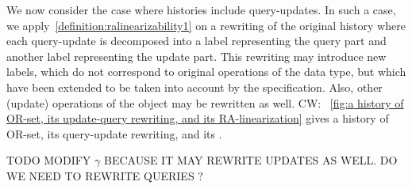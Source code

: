 We now consider the case where histories include query-updates.
In such a case, we apply~\autoref{definition:ralinearizability1} on a
rewriting of the original history where each query-update is
decomposed into a label representing the query part and another label
representing the update part.
{This rewriting may introduce new labels, which do not correspond to
original operations of the data type, but which have been extended to
be taken into account by the specification.
Also, other (update) operations of the object may be rewritten as
well.}
 {\color {red}CW: \figurename~\ref{fig:a history of OR-set, its update-query rewriting, and its RA-linearization} gives a history of OR-set, its query-update rewriting, and its \crdtlinearization{}.}

TODO MODIFY $\gamma$ BECAUSE IT MAY REWRITE UPDATES AS WELL. DO WE NEED TO REWRITE QUERIES ?

